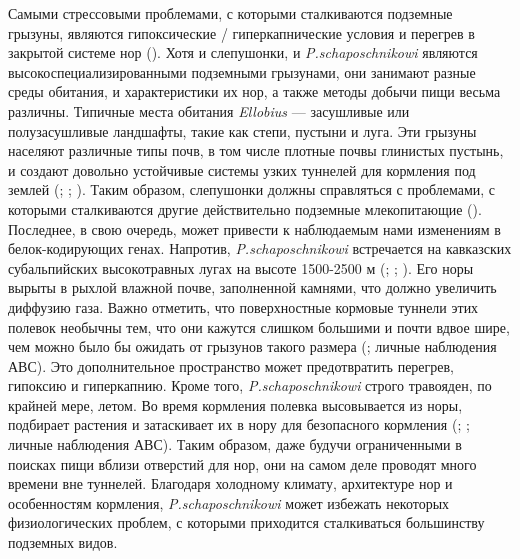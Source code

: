 Самыми стрессовыми проблемами, с которыми сталкиваются подземные грызуны, являются гипоксические / гиперкапнические условия и перегрев в закрытой системе нор (\cite{Lacey2000}). Хотя и слепушонки, и \textit{P.schaposchnikowi} являются высокоспециализированными подземными грызунами, они занимают разные среды обитания, и характеристики их нор, а также методы добычи пищи весьма различны. Типичные места обитания \textit{Ellobius} --- засушливые или полузасушливые ландшафты, такие как степи, пустыни и луга. Эти грызуны населяют различные типы почв, в том числе плотные почвы глинистых пустынь, и создают довольно устойчивые системы узких туннелей для кормления под землей (\cite{Ognev1950}; \cite{Gromov1977}; \cite{Shubin1978}). Таким образом, слепушонки должны справляться с проблемами, с которыми сталкиваются другие действительно подземные млекопитающие (\cite{Lacey2000}). Последнее, в свою очередь, может привести к наблюдаемым нами изменениям в белок-кодирующих генах. Напротив, \textit{P.schaposchnikowi} встречается на кавказских субальпийских высокотравных лугах на высоте 1500-2500 м (\cite{Vereshchagin1959}; \cite{Vorontsov1966}; \cite{Krystufek2005}). Его норы вырыты в рыхлой влажной почве, заполненной камнями, что должно увеличить диффузию газа. Важно отметить, что поверхностные кормовые туннели этих полевок необычны тем, что они кажутся слишком большими и почти вдвое шире, чем можно было бы ожидать от грызунов такого размера (\cite{Vorontsov1966}; личные наблюдения АВС). Это дополнительное пространство может предотвратить перегрев, гипоксию и гиперкапнию. Кроме того, \textit{P.schaposchnikowi} строго травояден, по крайней мере, летом. Во время кормления полевка высовывается из норы, подбирает растения и затаскивает их в нору для безопасного кормления (\cite{Gambaryan1957}; \cite{Zimina1977}; личные наблюдения АВС). Таким образом, даже будучи ограниченными в поисках пищи вблизи отверстий для нор, они на самом деле проводят много времени вне туннелей. Благодаря холодному климату, архитектуре нор и особенностям кормления, \textit{P.schaposchnikowi} может избежать некоторых физиологических проблем, с которыми приходится сталкиваться большинству подземных видов.

